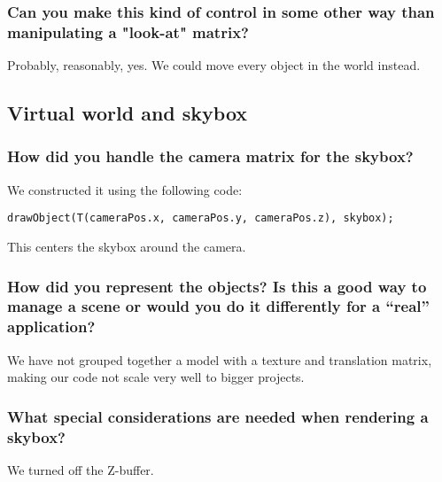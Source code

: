 \documentclass[a4paper,12pt]{article}
\begin{document}
\subsubsection{Can you make this kind of control in some other way
  than manipulating a "look-at" matrix?}
Probably, reasonably, yes. We could move every object in the world instead.

\subsection{Virtual world and skybox}
\subsubsection{How did you handle the camera matrix for the skybox?}
We constructed it using the following code:
\begin{lstlisting}[float,label=lst:cameramatrix,caption=nextHopInfo: Camera matrix code]
  	drawObject(T(cameraPos.x, cameraPos.y, cameraPos.z), skybox);
\end{lstlisting}
This centers the skybox around the camera.

\subsubsection{How did you represent the objects? Is this a good way to manage a scene or would you do it differently for a ``real'' application?}
We have not grouped together a model with a texture and translation matrix, making our code not scale very well to bigger projects.

\subsubsection{What special considerations are needed when rendering a skybox?}
We turned off the Z-buffer.
\end{document}
